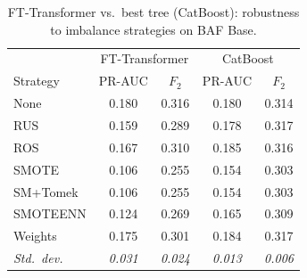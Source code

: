 \begin{table}[ht!]
\centering
\caption{FT-Transformer vs.\ best tree (CatBoost): robustness to imbalance strategies on BAF Base.}
\label{tab:transformer_robustness_baf}
\begin{tabular}{l cc cc}
\toprule
& \multicolumn{2}{c}{FT-Transformer} & \multicolumn{2}{c}{CatBoost} \\
Strategy & PR-AUC & $F_2$ & PR-AUC & $F_2$ \\
\midrule
None      & 0.180 & 0.316 & 0.180 & 0.314 \\
RUS       & 0.159 & 0.289 & 0.178 & 0.317 \\
ROS       & 0.167 & 0.310 & 0.185 & 0.316 \\
SMOTE     & 0.106 & 0.255 & 0.154 & 0.303 \\
SM+Tomek  & 0.106 & 0.255 & 0.154 & 0.303 \\
SMOTEENN  & 0.124 & 0.269 & 0.165 & 0.309 \\
Weights   & 0.175 & 0.301 & 0.184 & 0.317 \\
\midrule
\textit{Std.\ dev.} & \textit{0.031} & \textit{0.024} & \textit{0.013} & \textit{0.006} \\
\bottomrule
\end{tabular}
\end{table}
